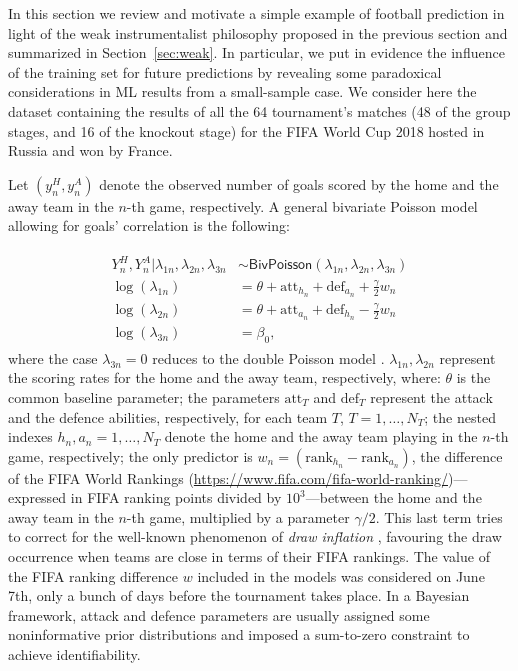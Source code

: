 \documentclass{statsoc}
\begin{document}
\color{black}

In this section we review and motivate a simple example of football prediction in light of  the weak instrumentalist philosophy proposed in the previous section and summarized in Section~\ref{sec:weak}. In particular, we put in evidence the influence of the training set for future predictions by revealing some paradoxical considerations  in ML results from  a small-sample case. We consider here the dataset containing the results of all the 64 tournament's matches (48 of the group stages, and 16 of the knockout stage) for the FIFA World Cup 2018 hosted in Russia and won by France.

Let $(y^{H}_{n}, y^{A}_{n})$ denote the observed number of goals scored by the home and the away team in the $n$-th game, respectively. A general bivariate Poisson model allowing for goals' correlation \citep{karlis2003analysis} is the following:

\begin{eqnarray}
\begin{split}
Y^H_n, Y^A_n| \lambda_{1n}, \lambda_{2n}, \lambda_{3n} & \sim \mathsf{BivPoisson}(\lambda_{1n}, \lambda_{2n}, \lambda_{3n})\\ 
\log(\lambda_{1n}) & = \theta+\text{att}_{h_n}+\text{def}_{a_n}+\frac{\gamma}{2} w_n\\
\log(\lambda_{2n}) & = \theta+\text{att}_{a_n}+\text{def}_{h_n}-\frac{\gamma}{2} w_n\\
\log(\lambda_{3n}) & =\beta_0,
\end{split}
\label{eq:bivariate}
\end{eqnarray}
where the case $\lambda_{3n}=0$ reduces to the double Poisson model \citep{baio2010bayesian}.  $\lambda_{1n}, \lambda_{2n}$ represent the scoring rates for the home and the away team, respectively, where: $\theta$ is the common baseline parameter; the parameters $\text{att}_T$ and $\text{def}_T$ represent the attack and the defence abilities, 
respectively, for each team $T$, $T=1,\ldots,N_T$; the nested indexes $h_{n}, a_{n}=1,\ldots,N_T$ denote the home and the away team playing in the $n$-th game, 
respectively; the only predictor is $w_n= (\text{rank}_{h_n}- \text{rank}_{a_n} )$, the difference of the FIFA World Rankings (\url{https://www.fifa.com/fifa-world-ranking/})---expressed in FIFA ranking points divided by $10^3$---between the home and the away team in 
the $n$-th game, multiplied by a parameter ${\gamma}/{2}$.  This last term tries to correct for the well-known phenomenon of \emph{draw inflation} \citep{karlis2003analysis}, 
favouring the draw occurrence when teams are close in terms of their FIFA rankings. The value of the 
FIFA ranking difference $w$ included in the models was considered on June 7th, only a bunch 
of days before the tournament takes place.  In a Bayesian framework, attack and defence parameters are usually assigned some noninformative prior distributions \citep{baio2010bayesian} and imposed a sum-to-zero constraint to achieve identifiability.
\end{document}
